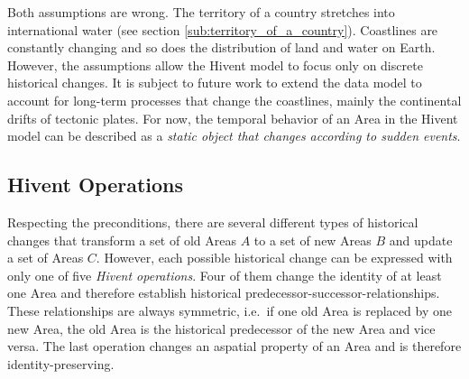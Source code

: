 Both assumptions are wrong. The territory of a country stretches into international water (see section \ref{sub:territory_of_a_country}). Coastlines are constantly changing and so does the distribution of land and water on Earth. However, the assumptions allow the Hivent model to focus only on discrete historical changes. It is subject to future work to extend the data model to account for long-term processes that change the coastlines, mainly the continental drifts of tectonic plates. For now, the temporal behavior of an Area in the Hivent model can be described as a \emph{static object that changes according to sudden events}.


\subsection{Hivent Operations} %
\label{sub:hivent_operations}

Respecting the preconditions, there are several different types of historical changes that transform a set of old Areas $A$ to a set of new Areas $B$ and update a set of Areas $C$. However, each possible historical change can be expressed with only one of five \emph{Hivent operations}. Four of them change the identity of at least one Area and therefore establish historical predecessor-successor-relationships. These relationships are always symmetric, i.e.\ if one old Area is replaced by one new Area, the old Area is the historical predecessor of the new Area and vice versa. The last operation changes an aspatial property of an Area and is therefore identity-preserving.


